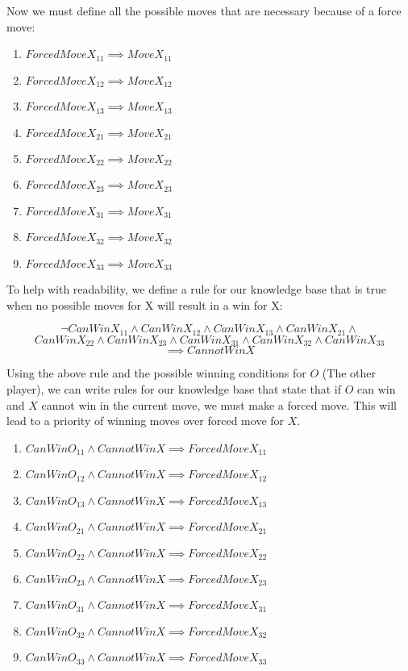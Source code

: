 \documentclass[22pt]{article}
\begin{document}
\noindent Now we must define all the possible moves that are necessary because 
of a force move:

\begin{multicols}{2}
\begin{enumerate}
	\item $ForcedMoveX_{11} \implies MoveX_{11}$
	\item $ForcedMoveX_{12} \implies MoveX_{12}$
	\item $ForcedMoveX_{13} \implies MoveX_{13}$
	\item $ForcedMoveX_{21} \implies MoveX_{21}$
	\item $ForcedMoveX_{22} \implies MoveX_{22}$
	\item $ForcedMoveX_{23} \implies MoveX_{23}$
	\item $ForcedMoveX_{31} \implies MoveX_{31}$
	\item $ForcedMoveX_{32} \implies MoveX_{32}$
	\item $ForcedMoveX_{33} \implies MoveX_{33}$
\end{enumerate}
\end{multicols}

\noindent To help with readability, we define a rule for our knowledge base that is true
when no possible moves for X will result in a win for X:

$$\neg CanWinX_{11} \land CanWinX_{12} \land CanWinX_{13} \land CanWinX_{21} \land $$
$$ CanWinX_{22} \land CanWinX_{23} \land CanWinX_{31} \land CanWinX_{32} \land CanWinX_{33} $$
$$ \implies CannotWinX $$

\noindent Using the above rule and the possible winning conditions for $O$ (The other player), we can 
write rules for our knowledge base that state that if $O$ can win and $X$ cannot win in 
the current move, we must make a forced move. This will lead to a priority of winning moves
over forced move for $X$.

\begin{enumerate}
	\item $CanWinO_{11} \land CannotWinX \implies ForcedMoveX_{11}$
	\item $CanWinO_{12} \land CannotWinX \implies ForcedMoveX_{12}$
	\item $CanWinO_{13} \land CannotWinX \implies ForcedMoveX_{13}$
	\item $CanWinO_{21} \land CannotWinX \implies ForcedMoveX_{21}$
	\item $CanWinO_{22} \land CannotWinX \implies ForcedMoveX_{22}$
	\item $CanWinO_{23} \land CannotWinX \implies ForcedMoveX_{23}$
	\item $CanWinO_{31} \land CannotWinX \implies ForcedMoveX_{31}$
	\item $CanWinO_{32} \land CannotWinX \implies ForcedMoveX_{32}$
	\item $CanWinO_{33} \land CannotWinX \implies ForcedMoveX_{33}$
\end{enumerate}
\end{document}
